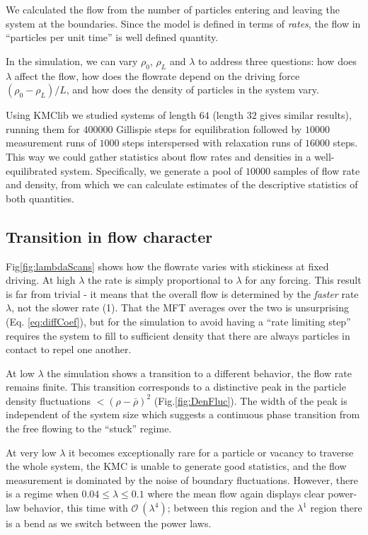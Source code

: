 \documentclass[
reprint, amsmath,amssymb,
]{revtex4-1}
\begin{document}
We calculated the flow from the number of particles entering and
leaving the system at the boundaries.  Since the model is defined in
terms of {\it rates}, the flow in ``particles per unit time'' is well
defined quantity.

In the simulation, we can vary $\rho_0$, $\rho_L$ and $\lambda$ to
address three questions: how does $\lambda$ affect the flow, how does
the flowrate depend on the driving force $(\rho_0 - \rho_L)/L$, and
how does the density of particles in the system vary.

Using KMClib we studied systems of length $64$ (length $32$ gives similar
results), running them for $400000$ Gillispie steps for equilibration
followed by $10000$ measurement runs of $1000$ steps interspersed with
relaxation runs of $16000$ steps. This way we could gather statistics
about flow rates and densities in a well-equilibrated
system. Specifically, we generate a pool of $10000$ samples of flow
rate and density, from which we can calculate estimates of the
descriptive statistics of both quantities.


\subsection{Transition in flow character}

Fig\ref{fig:lambdaScans} shows how the flowrate varies with stickiness
at fixed driving.  At high $\lambda$ the rate is simply proportional
to $\lambda$ for any forcing.  This result is far from trivial - it
means that the overall flow is determined by the {\it faster} rate
$\lambda$, not the slower rate (1).  That the MFT averages over the
two is unsurprising (Eq. \ref{eq:diffCoef}), but for the
simulation to avoid having a ``rate limiting step'' requires the
system to fill to sufficient density that there are always particles
in contact to repel one another.

At low $\lambda$ the simulation shows a transition to a different
behavior, the flow rate remains finite.  This transition corresponds
to a distinctive peak in the particle density fluctuations
$<(\rho-\bar{\rho})^2$ (Fig.\ref{fig:DenFluc}).  The width of the peak is independent of the
system size 
which suggests a continuous
phase transition from the free flowing to the ``stuck'' regime.

At very low
$\lambda$ it becomes exceptionally rare for a particle or vacancy to
traverse the whole system, the KMC is unable to generate good statistics, 
and the flow measurement is dominated by
the noise of boundary fluctuations.
However, there is a regime when $0.04 \le \lambda \le 0.1$
where the mean flow again displays clear power-law behavior, this time
with $\mathcal{O}~(\lambda^{4})$; between this region and the
$\lambda^1$ region there is a bend as we switch between the power laws.
\end{document}

